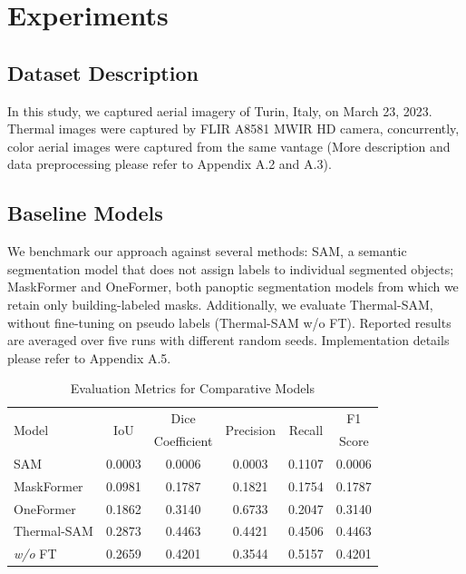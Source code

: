 \documentclass{article}
\theoremstyle{plain}
\theoremstyle{definition}
\theoremstyle{remark}
\begin{document}
\section{Experiments}
\subsection{Dataset Description}
In this study, we captured aerial imagery of Turin, Italy, on March 23, 2023.  Thermal images were captured by FLIR A8581 MWIR HD camera, concurrently, color aerial images were captured from the same vantage (More description and data preprocessing please refer to Appendix A.2 and A.3). 

\subsection{Baseline Models}
We benchmark our approach against several methods: SAM, a semantic segmentation model that does not assign labels to individual segmented objects; MaskFormer \cite{cheng2021per} and OneFormer, both panoptic segmentation models from which we retain only building-labeled masks. Additionally, we evaluate Thermal-SAM, without fine-tuning on pseudo labels (Thermal-SAM w/o FT). Reported results are averaged over five runs with different random seeds. Implementation details please refer to Appendix A.5.

\begin{table}[h] 
\centering
\small
\setlength\tabcolsep{1.5pt}

\caption{Evaluation Metrics for Comparative Models}
\label{tab:evaluation_metrics}
\begin{tabular}{lccccc}
    \toprule
    \multirow{2}{*}{Model}    & \multirow{2}{*}{IoU}   &{Dice } & \multirow{2}{*}{Precision} & \multirow{2}{*}{Recall} &{F1 }\\
        &    & Coefficient &  &  & Score \\
    \midrule
    SAM      &  0.0003 &  0.0006            & 0.0003     & 0.1107  & 0.0006   \\
    \hline
    MaskFormer      &   0.0981 &  0.1787           & 0.1821   & 0.1754  & 0.1787   \\
    \hline
    
    OneFormer    & 0.1862  &    0.3140         &  0.6733   &  0.2047 & 0.3140  \\
    \hline
    Thermal-SAM     & 0.2873 & 0.4463             & 0.4421    & 0.4506   & 0.4463   \\
   \textit{w/o} FT   & 0.2659 & 0.4201            &  0.3544    &  0.5157  &  0.4201    \\
    \bottomrule
\end{tabular}
\end{table}
\end{document}
